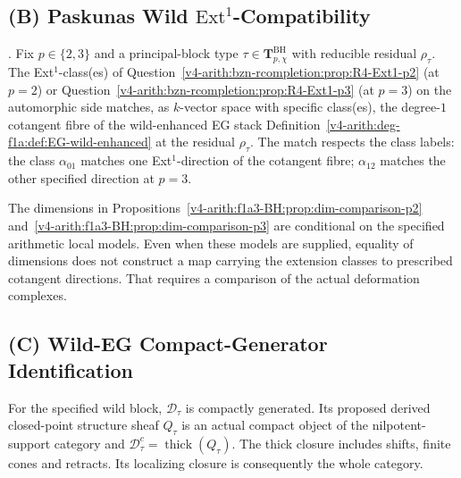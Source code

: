 \subsection{(B) Paskunas Wild \(\mathrm{Ext}^{1}\)-Compatibility}

\begin{conjecture}
\label{v4-arith:f1a3-BH:conj:Paskunas-wild-ext}
\ClaimStatusConjectured. Fix \(p\in\{2,3\}\) and a principal-block type
\(\tau\in\mathbf{T}^{\mathrm{BH}}_{p,\chi}\) with reducible residual
\(\rho_{\tau}\). The Ext\({}^{1}\)-class(es) of
Question~\ref{v4-arith:bzn-rcompletion:prop:R4-Ext1-p2} (at \(p=2\)) or
Question~\ref{v4-arith:bzn-rcompletion:prop:R4-Ext1-p3} (at \(p=3\)) on the
automorphic side matches, as \(k\)-vector space with specific class(es),
the degree-\(1\) cotangent fibre of the wild-enhanced EG stack
Definition~\ref{v4-arith:deg-f1a:def:EG-wild-enhanced} at the residual \(\rho_{\tau}\).
The match respects the class labels: the class \(\alpha_{01}\) matches
one Ext\({}^{1}\)-direction of the cotangent fibre; \(\alpha_{12}\)
matches the other specified direction at \(p=3\).
\end{conjecture}

\begin{remark}
\label{v4-arith:f1a3-BH:rem:Paskunas-wild-ext-evidence}
The dimensions in
Propositions~\ref{v4-arith:f1a3-BH:prop:dim-comparison-p2}
and~\ref{v4-arith:f1a3-BH:prop:dim-comparison-p3} are conditional
on the specified arithmetic local models. Even when these models
are supplied, equality of dimensions does not construct a map
carrying the extension classes to prescribed cotangent directions.
That requires a comparison of the actual deformation complexes.
\end{remark}

\subsection{(C) Wild-EG Compact-Generator Identification}

\begin{conjecture}
\label{v4-arith:f1a3-BH:conj:wild-compact-generation}
For the specified wild block, \(\mathcal D_\tau\) is compactly
generated. Its proposed derived closed-point structure sheaf
\(Q_\tau\) is an actual compact object of the nilpotent-support
category and \(\mathcal D_\tau^c=\operatorname{thick}(Q_\tau)\).
The thick closure includes shifts, finite cones and retracts.
Its localizing closure is consequently the whole category.
\end{conjecture}


